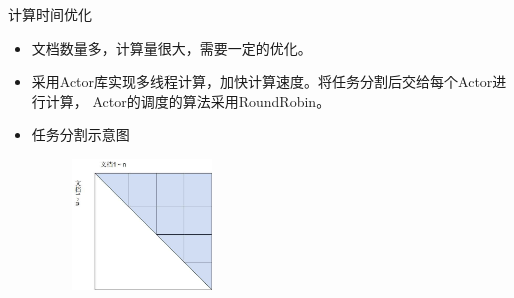 \documentclass[presentation]{beamer}
\begin{document}
\begin{frame}[label=sec-2-13]{计算时间优化}
\begin{itemize}
\item 文档数量多，计算量很大，需要一定的优化。
\item 采用Actor库实现多线程计算，加快计算速度。将任务分割后交给每个Actor进行计算，
Actor的调度的算法采用RoundRobin。
\item 任务分割示意图
\begin{figure}[hb]
  \centering
  \includegraphics[width=0.35\textwidth]{triangle.jpg}
\end{figure}
\end{itemize}
\end{frame}
\end{document}
